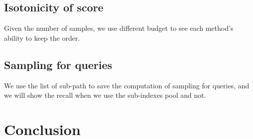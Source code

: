 \documentclass[letterpaper]{article}
\begin{document}
\subsection{Isotonicity of score}
Given the number of samples, we use different budget to see each method's ability to keep the order.

\subsection{Sampling for queries}
We use the list of sub-path to save the computation of sampling for queries, and we will show the recall when we use the sub-indexes pool and not.

\section{Conclusion}




\end{document}
